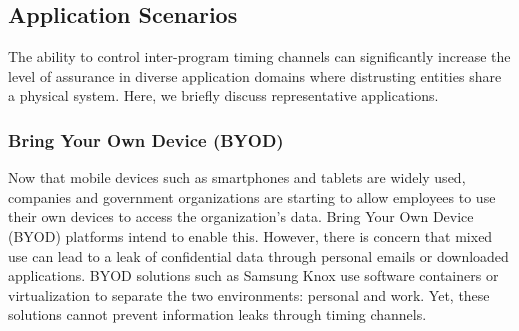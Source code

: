 

\subsection{Application Scenarios}

The ability to control inter-program timing channels can significantly increase the
level of
assurance in diverse application domains where distrusting entities share a
physical system. Here, we briefly discuss representative applications.

\subsubsection{Bring Your Own Device (BYOD)}

Now that mobile devices such as smartphones and tablets are widely used, 
companies and government organizations are starting to allow employees to
use their own devices to access the organization's data.
Bring Your Own Device (BYOD) platforms intend to enable this. However, there is 
concern that mixed use can lead to a leak of confidential data through personal 
emails or
downloaded applications. BYOD solutions such as Samsung Knox use
software containers or virtualization to separate the two environments:
personal and work. Yet, these solutions cannot prevent information leaks
through timing channels.


